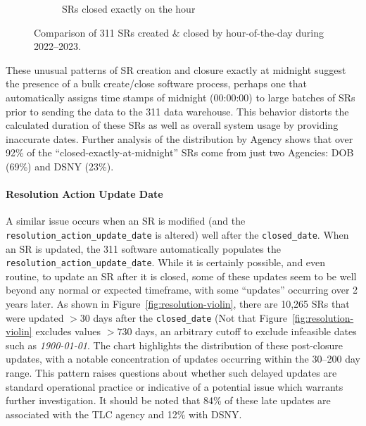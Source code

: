 \documentclass[linenumber]{jdsart}
\begin{document}
\begin{figure}[tbp]
\begin{subfigure}[t]{0.495\textwidth}
        \caption{SRs closed exactly on the hour}
        \label{fig:busiestclosed}
    \end{subfigure}
    \caption{Comparison of 311 SRs created \& closed by hour-of-the-day during 2022--2023.}
    \label{fig:exacthours}
\end{figure}

These unusual patterns of SR creation and closure exactly at midnight 
suggest the presence of a bulk create/close software process, perhaps one
that automatically assigns time stamps of midnight (00:00:00) to 
large batches of SRs prior to sending the data to the 311 
data warehouse. This behavior distorts the calculated duration of these 
SRs as well as overall system usage by providing inaccurate 
dates. Further analysis of the distribution by Agency shows that over 92\% of 
the ``closed-exactly-at-midnight'' SRs come from just two 
Agencies: DOB (69\%) and DSNY  (23\%).

\paragraph{Resolution Action Update Date}
A similar issue occurs when an SR is modified (and the \texttt{resolution\_action\_update\_date} is altered) well 
after the \texttt{closed\_date}.  When an SR is 
updated, the 311 software automatically populates the \texttt{resolution\_action\_update\_date}. While it is certainly 
possible, and even routine, to update an SR after it is closed, 
some of these updates seem to be well beyond any 
normal or expected timeframe, with some ``updates'' 
occurring over 2 years later. As shown in Figure~\ref{fig:resolution-violin}, 
there are 10,265 SRs that were updated $>30$ days after the 
\texttt{closed\_date} (Not that Figure~\ref{fig:resolution-violin} excludes 
values $>730$ days, an arbitrary cutoff to exclude 
infeasible dates such as \textit{1900-01-01}. The chart 
highlights the distribution of these post-closure 
 updates, with a notable concentration of updates occurring within 
the 30--200 day range. This pattern raises 
questions about whether such delayed updates are standard 
operational practice or indicative of a potential issue 
which warrants further investigation. It should be noted
that 84\% of these late updates are associated with the TLC agency
and 12\% with DSNY.
\end{document}
